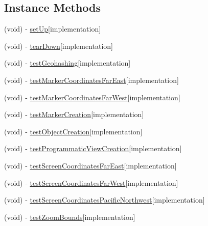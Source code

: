 \subsection*{Instance Methods}
\begin{DoxyCompactItemize}
\item 
(void) -\/ \hyperlink{interface_route_me_tests_a867ad49ad8d74b18ccd67e02624a3113}{set\-Up}{\ttfamily  \mbox{[}implementation\mbox{]}}
\item 
(void) -\/ \hyperlink{interface_route_me_tests_a3f12f90d3ad844b9fc382d81d202394f}{tear\-Down}{\ttfamily  \mbox{[}implementation\mbox{]}}
\item 
(void) -\/ \hyperlink{interface_route_me_tests_af51e05e39b9d7cd0e419723efd5557aa}{test\-Geohashing}{\ttfamily  \mbox{[}implementation\mbox{]}}
\item 
(void) -\/ \hyperlink{interface_route_me_tests_a1e36cba537fa66e34ece7d5b49e26bd8}{test\-Marker\-Coordinates\-Far\-East}{\ttfamily  \mbox{[}implementation\mbox{]}}
\item 
(void) -\/ \hyperlink{interface_route_me_tests_a32fca6c17a012c41cba6e7911502734f}{test\-Marker\-Coordinates\-Far\-West}{\ttfamily  \mbox{[}implementation\mbox{]}}
\item 
(void) -\/ \hyperlink{interface_route_me_tests_aea12039048ea4753e64f97b22609a40f}{test\-Marker\-Creation}{\ttfamily  \mbox{[}implementation\mbox{]}}
\item 
(void) -\/ \hyperlink{interface_route_me_tests_a820a90160eee2e408ac029abfba9944e}{test\-Object\-Creation}{\ttfamily  \mbox{[}implementation\mbox{]}}
\item 
(void) -\/ \hyperlink{interface_route_me_tests_ab77a0a09f7fe08f0b9d6389dae0ab983}{test\-Programmatic\-View\-Creation}{\ttfamily  \mbox{[}implementation\mbox{]}}
\item 
(void) -\/ \hyperlink{interface_route_me_tests_a14fe6371f0e149c3b868ec4b38f2e452}{test\-Screen\-Coordinates\-Far\-East}{\ttfamily  \mbox{[}implementation\mbox{]}}
\item 
(void) -\/ \hyperlink{interface_route_me_tests_a0ef93ed0f6ce82d21c80ba1b9852a8ed}{test\-Screen\-Coordinates\-Far\-West}{\ttfamily  \mbox{[}implementation\mbox{]}}
\item 
(void) -\/ \hyperlink{interface_route_me_tests_ad4644fd7d78820658e4de38e56a0bda9}{test\-Screen\-Coordinates\-Pacific\-Northwest}{\ttfamily  \mbox{[}implementation\mbox{]}}
\item 
(void) -\/ \hyperlink{interface_route_me_tests_a45b1f6e515e7c519cc4ab1b7d5f49da9}{test\-Zoom\-Bounds}{\ttfamily  \mbox{[}implementation\mbox{]}}
\end{DoxyCompactItemize}
